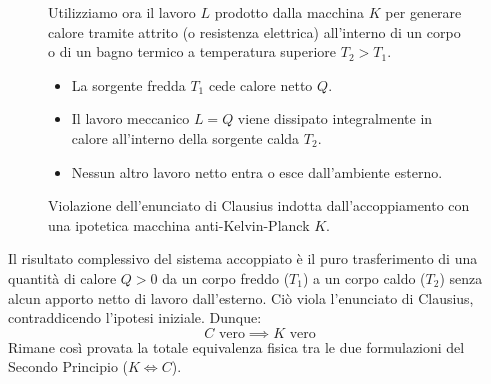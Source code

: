 \begin{figure}[ht]
\centering
\begin{minipage}{0.46\textwidth}
\centering
{}
\end{minipage}\hfill
\begin{minipage}{0.50\textwidth}
Utilizziamo ora il lavoro $L$ prodotto dalla macchina $K$ per generare calore tramite attrito (o resistenza elettrica) all'interno di un corpo o di un bagno termico a temperatura superiore $T_2 > T_1$.
\begin{itemize}
    \item La sorgente fredda $T_1$ cede calore netto $Q$.
    \item Il lavoro meccanico $L = Q$ viene dissipato integralmente in calore all'interno della sorgente calda $T_2$.
    \item Nessun altro lavoro netto entra o esce dall'ambiente esterno.
\end{itemize}
\end{minipage}
\caption{Violazione dell'enunciato di Clausius indotta dall'accoppiamento con una ipotetica macchina anti-Kelvin-Planck $K$.}
\end{figure}

Il risultato complessivo del sistema accoppiato è il puro trasferimento di una quantità di calore $Q > 0$ da un corpo freddo ($T_1$) a un corpo caldo ($T_2$) senza alcun apporto netto di lavoro dall'esterno. Ciò viola l'enunciato di Clausius, contraddicendo l'ipotesi iniziale. Dunque:
\begin{equation}
    C \text{ vero} \implies K \text{ vero}
\end{equation}
Rimane così provata la totale equivalenza fisica tra le due formulazioni del Secondo Principio ($K \iff C$).

